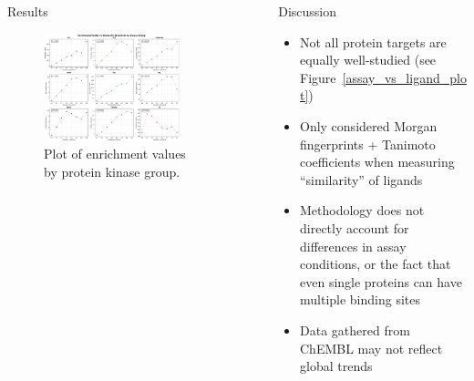 \documentclass[final]{beamer}
\newlength{\sepwidth}
\newlength{\colwidth}
\newcommand{\separatorcolumn}{\begin{column}{\sepwidth}\end{column}}
\begin{document}
\begin{frame}[t]
\begin{columns}[t]
\begin{column}{\colwidth}
\begin{block}{Results}
\begin{figure}
        \includegraphics[width=0.85\textwidth]{../figures/enrichment_factor_by_group.png}
        \caption{Plot of enrichment values by protein kinase group.}
        \label{enrichment_plot}
    \end{figure}

  \end{block}

\end{column}

\separatorcolumn

\begin{column}{\colwidth} 
  \begin{block}{Discussion}
    \small
    \begin{itemize}
        \item Not all protein targets are equally well-studied (see Figure~\ref{assay_vs_ligand_plot})
        \item Only considered Morgan fingerprints + Tanimoto coefficients when measuring ``similarity'' of ligands
        \item Methodology does not directly account for differences in assay conditions, or the fact that even single proteins can have multiple binding sites
        \item Data gathered from ChEMBL may not reflect global trends
    \end{itemize}


\end{block}
\end{column}
\end{columns}
\end{frame}
\end{document}
